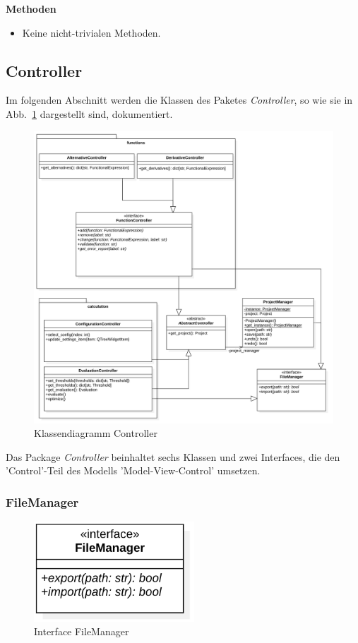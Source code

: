 \documentclass{article}
\begin{document}
\textbf{Methoden}
\begin{itemize}\setlength\itemsep{3em}
\item[] Keine nicht-trivialen Methoden.
\end{itemize}
\newpage
\subsection{Controller}

Im folgenden Abschnitt werden die Klassen des Paketes \emph{Controller}, so wie sie in Abb.~\ref{fig:ControllerKlassendiagramm} dargestellt sind, dokumentiert.

\begin{figure}[H]%
    \centering
    \includegraphics[width=13cm]{entwurf/Floriane/ControllerKlassendiagramm.png}
    \caption{Klassendiagramm Controller}
    \label{fig:ControllerKlassendiagramm}
\end{figure}

Das Package \textit{Controller} beinhaltet sechs Klassen und zwei Interfaces, die den 'Control'-Teil des Modells 'Model-View-Control' umsetzen.

\newpage
\subsubsection*{\large{\textbf{FileManager}\label{cls:FileManager}}}\normalsize
\begin{figure}[H]%
    \centering
    \includegraphics[width=6cm]{entwurf/Floriane/FileManager.png}
    \caption{Interface FileManager}
\end{figure}
\end{document}
